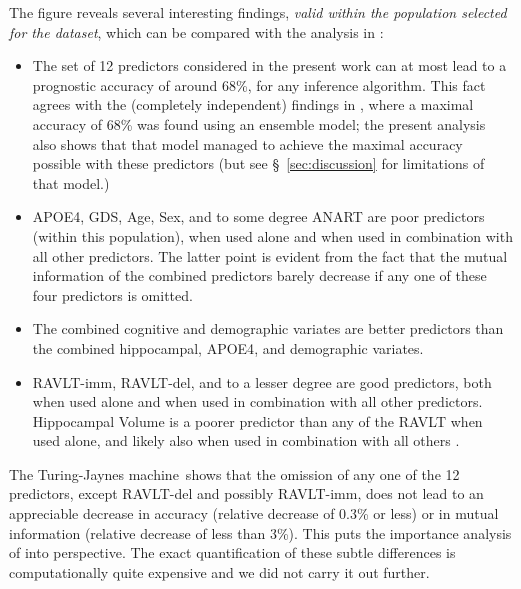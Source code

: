 \documentclass[utf8]{FrontiersinHarvard} %
\newcommand*{\sect}{\S}%
\renewcommand*{\|}[1][]{\nonscript\:#1\vert\nonscript\:\mathopen{}}
\newcommand*{\tjm}{Turing-Jaynes machine}
\begin{document}
The figure reveals several interesting findings, \emph{valid within the population selected for the dataset}, which can be compared with the analysis in  \cite[see especially Fig.~3 and Table~3]{ryeetal2022}:
\begin{itemize}
\item The set of 12 predictors considered in the present work \citep[and in ][]{ryeetal2022} can at most lead to a prognostic accuracy of around 68\%, for any inference algorithm. This fact agrees with the (completely independent) findings in \cite{ryeetal2022}, where a maximal accuracy of 68\% was found using an ensemble model; the present analysis also shows that that model managed to achieve the maximal accuracy possible with these predictors (but see \sect~\ref{sec:discussion} for limitations of that model.)
\item \textsf{APOE4}, \textsf{GDS}, \textsf{Age}, \textsf{Sex}, and to some degree \textsf{ANART} are poor predictors (within this population), when used alone and when used in combination with all other predictors. The latter point is evident from the fact that the mutual information of the combined predictors barely decrease if any one of these four predictors is omitted.
\item The combined cognitive and demographic variates are better predictors than the combined hippocampal, \textsf{APOE4}, and demographic variates.
\item \textsf{RAVLT-imm}, \textsf{RAVLT-del}, and to a lesser degree are good predictors, both when used alone and when used in combination with all other predictors. Hippocampal Volume is a poorer predictor than any of the \textsf{RAVLT} when used alone, and likely also when used in combination with all others \citep[contrast this with]{ryeetal2022}.
\end{itemize}

The \tjm\ shows that the omission of any one of the 12 predictors, except \textsf{RAVLT-del} and possibly \textsf{RAVLT-imm}, does not lead to an appreciable decrease in accuracy (relative decrease of 0.3\% or less) or in mutual information (relative decrease of less than 3\%). This puts the importance analysis of \citealp{ryeetal2022} into perspective. The exact quantification of these subtle differences is computationally quite expensive and we did not carry it out further.
\end{document}
